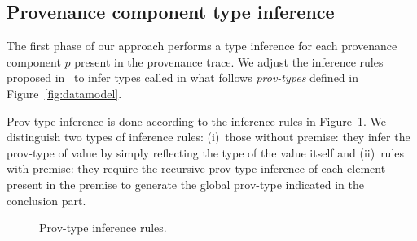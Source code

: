 \subsection{Provenance component type inference}
The first phase of our approach performs a type inference for each provenance component $p$ present in the provenance trace. We adjust the inference rules proposed in~\cite{baazizi2017} to infer types called in what follows \emph{prov-types} defined in Figure~\ref{fig:datamodel}.

Prov-type inference is done according to the inference rules in Figure~\ref{fig:typinf}.
We distinguish two types of inference rules: (i)~those without premise: they infer the prov-type of value by simply reflecting the type of the value itself and (ii)~rules with premise: they require the recursive prov-type inference of each element present in the premise to generate the global prov-type indicated in the conclusion part. 



 \begin{figure}[t]
 \centering
{}
 \caption{\label{fig:typinf}Prov-type inference rules.}
 \end{figure}



